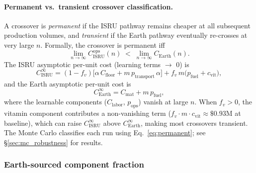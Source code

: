 \documentclass[preprint,12pt]{elsarticle}
\begin{document}
\paragraph{Permanent vs.\ transient crossover classification.} A crossover is \emph{permanent} if the ISRU pathway remains cheaper at all subsequent production volumes, and \emph{transient} if the Earth pathway eventually re-crosses at very large $n$. Formally, the crossover is permanent iff
\begin{equation}
  \lim_{n \to \infty} C_{\mathrm{ISRU}}^{\mathrm{ops}}(n) \;<\; \lim_{n \to \infty} C_{\mathrm{Earth}}(n).
  \label{eq:permanent}
\end{equation}
The ISRU asymptotic per-unit cost (learning terms $\to$ 0) is
\[
  C_{\mathrm{ISRU}}^{\infty} = (1 - f_v)\bigl[\alpha \, C_{\mathrm{floor}} + m \, p_{\mathrm{transport}} \, \alpha\bigr] + f_v \, m \bigl(p_{\mathrm{fuel}} + c_{\mathrm{vit}}\bigr),
\]
and the Earth asymptotic per-unit cost is
\[
  C_{\mathrm{Earth}}^{\infty} = C_{\mathrm{mat}} + m \, p_{\mathrm{fuel}},
\]
where the learnable components ($C_{\mathrm{labor}}$, $p_{\mathrm{ops}}$) vanish at large $n$. When $f_v > 0$, the vitamin component contributes a non-vanishing term ($f_v \cdot m \cdot c_{\mathrm{vit}} \approx \$0.93$M at baseline), which can raise $C_{\mathrm{ISRU}}^{\infty}$ above $C_{\mathrm{Earth}}^{\infty}$, making most crossovers transient. The Monte Carlo classifies each run using Eq.~\ref{eq:permanent}; see \S\ref{sec:mc_robustness} for results.

\subsubsection{Earth-sourced component fraction}
\label{sec:vitamin}
\end{document}
